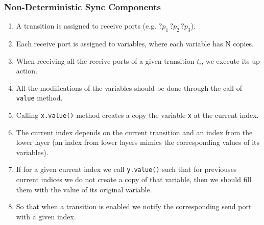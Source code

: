 \documentclass[compress,xcolor=dvipsnames,10pt]{beamer}
\begin{document}
\begin{frame}
 \frametitle{Non-Deterministic Sync Components}
 \begin{enumerate}
 \item A transition is assigned to receive ports (e.g. $?p_1 \, ?p_2 \, ?p_3$).
  \item Each receive port is assigned to variables, where each variable has N copies. 
  \item When receiving all the receive ports of a given transition $t_i$, we execute its up action. 
  \item All the modifications of the variables should be done through the call of \texttt{value} method. 
  \item Calling \texttt{x.value()} method creates a copy the variable \texttt{x} at the current index. 
  \item The current index depends on the current transition and an index from the lower layer (an index from lower layers mimics the corresponding values of its variables). 
  \item If for a given current index we call \texttt{y.value()} such that for previouses current indices we do not create a copy of that variable, then we should fill them with the value of its original variable. 
 \item So that when a transition is enabled we notify the corresponding send port with a given index. 
 \end{enumerate}

\end{frame}
\end{document}
